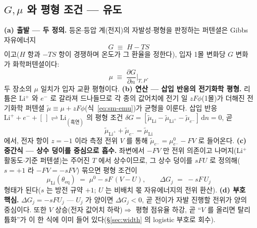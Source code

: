 \documentclass[11pt,a4paper]{article}
\newcommand{\dd}{\mathrm{d}}
\newcommand{\eq}{\mathrm{eq}}
\begin{document}
\subsection{$G,\mu$ 와 평형 조건 — 유도}
\textbf{(a) 출발 — 두 정의.} 등온$\cdot$등압 계(전지)의 자발성$\cdot$평형을 판정하는 퍼텐셜은 Gibbs 자유에너지
\begin{equation}
G\;\equiv\;H-TS
\label{eq:gibbsdef}
\end{equation}
이고($H$ 항과 $-TS$ 항이 경쟁하며 온도가 그 환율을 정한다), 입자 1몰 변화당 $G$ 변화가 화학퍼텐셜이다:
\begin{equation}
\mu\;\equiv\;\frac{\partial G}{\partial n}\Big|_{T,P}.
\label{eq:mudef}
\end{equation}
두 장소의 $\mu$ 일치가 입자 교환 평형이다. \textbf{(b) 연산 — 삽입 반응의 전기화학 평형.} 리튬은 Li$^+$ 와 $e^-$ 로
갈라져 드나들므로 각 종의 값어치에 전기 일 $zF\phi$(1몰)가 더해진 전기화학 퍼텐셜 $\tilde\mu\equiv\mu+zF\phi$(식~\eqref{eq:sm-emu})가 균형을
이룬다. 삽입 반응 $\mathrm{Li}^++e^-+[\,]\rightleftharpoons\mathrm{Li}_{(\text{흑연})}$ 의 평형 조건
$\delta G=[\tilde\mu_\mathrm{Li}-\tilde\mu_{\mathrm{Li}^+}-\tilde\mu_{e^-}]\,\dd n=0$, 곧
\begin{equation}
\tilde\mu_{\mathrm{Li}^+}+\tilde\mu_{e^-}=\tilde\mu_\mathrm{Li}
\label{eq:eqbalance}
\end{equation}
에서, 전자 항이 $z=-1$ 이라 측정 전위 $V$ 를 통해 $\tilde\mu_{e^-}=\mu_{e^-}^0-FV$ 로 들어온다. \textbf{(c) 중간식 —
상수 덩이를 중심으로 흡수.} 좌변에서 $-FV$ 만 전위 의존이고 나머지(Li$^+$ 활동도$\cdot$기준 퍼텐셜)는 주어진 $T$ 에서
상수이므로, 그 상수 덩이를 $sFU$ 로 정의해($s=+1$ 라 $-FV=-sFV$) 묶으면 평형 조건이
\begin{equation}
\mu_\mathrm{Li}(\theta_\eq)\;=\;\mu^0-sF\,(V-U),
\qquad \Delta G_j\;=\;-sF\,U_j
\label{eq:eqcond}
\end{equation}
형태가 된다($s$ 는 방전 규약 $+1$; $U$ 는 비배치 몫 자유에너지의 전위 환산). \textbf{(d) 부호 핵심.} $\Delta G_j=-sFU_j$ —
$U_j$ 가 양이면 $\Delta G_j<0$, 곧 전이가 자발 진행할 전위가 양의 중심이다. 또한 $V$ 상승(전자 값어치 하락)$\Rightarrow$
평형 점유율 하강, 곧 ``$V$ 를 올리면 탈리튬화''가 이 한 식에 이미 들어 있다(\S\ref{sec:width} 의 logistic 부호로 회수).
\end{document}
